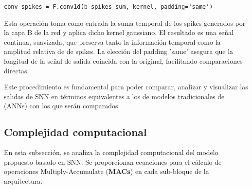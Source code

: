 \begin{verbatim}
conv_spikes = F.conv1d(b_spikes_sum, kernel, padding='same')
\end{verbatim}

Esta operación toma como entrada la suma temporal de los spikes generados por la capa B de la red y aplica dicho kernel gaussiano. El resultado es una señal continua, suavizada, que preserva tanto la información temporal como la amplitud relativa de de spikes. La elección del padding 'same' asegura que la longitud de la señal de salida coincida con la original, facilitando comparaciones directas.

Este procedimiento es fundamental para poder comparar, analizar y visualizar las salidas de SNN en términos equivalentes a los de modelos tradicionales de (ANNs) con los que serán comparados.

    
    
    

    
\subsection{Complejidad computacional}

En esta subsección, se analiza la complejidad computacional del modelo propuesto basado en SNN. Se proporcionan ecuaciones para el cálculo de operaciones Multiply-Accumulate (\textbf{MACs}) en cada sub-bloque de la arquitectura.

